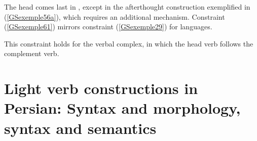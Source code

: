 %
%


The head comes last in , except in the afterthought construction exemplified in (\ref{GSexemple56a}), which requires an additional mechanism. Constraint (\ref{GSexemple61}) mirrors constraint (\ref{GSexemple29}) for  languages.
\ea
\label{GSexemple61}
 
\z

\noindent
This constraint holds for the verbal complex, in which the head verb follows the complement verb.



\section{Light verb constructions in Persian: Syntax and morphology, syntax and semantics}\label{GSsection5}

